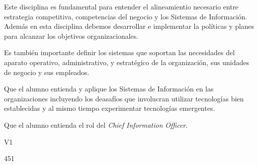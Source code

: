 \begin{syllabus}


\begin{justification}
	Este disciplina es fundamental para entender el alineamientio necesario entre estrategia competitiva, competencias del negocio y los Sistemas de Información. Además en esta disciplina debemos desarrollar e implementar la políticas y planes para alcanzar los objetivos organizacionales.
	
	Es también importante definir los sistemas que soportan las necesidades del aparato operativo, administrativo, y estratégico de la organización, sus unidades de negocio y sus empleados.
	\end{justification}
	
	\begin{goals}
	\item Que el alumno entienda y aplique los Sistemas de Información en las organizaciones incluyendo los deasafíos que involucran utilizar tecnologías bien establecidas y al mismo tiempo experimentar tecnologías emergentes.
	\item Que el alumno entienda el rol del \textit{Chief Information Officer}.
	\end{goals}
	
	\begin{outcomes}{V1}
		\item {}
		\item {}
		\item {}
		\item {}
		\item {}
	\end{outcomes}
	
	\begin{unit}{\LUTWOONEDef}{}{\LUTWOONEBib}{45}{1}
	   \begin{topics}
			\item \OMCONETopicTWOxONExFOUR
			\item \OMCONETopicTWOxONExFIVE
			\item \OMCTWOTopicTWOxTWOxFIVE
			\item \OMCTWOTopicTWOxTWOxONE
			\item \TDSSEVENTopicTHREExSEVENxFIVE
			\item \TDSONEOHTopicTHREExONEOHxEIGHT
			\item \OMCTWOTopicTWOxTWOxFOUR
	   \end{topics}
		\LUTWOONEGoal
	\end{unit}
	

\end{syllabus}
